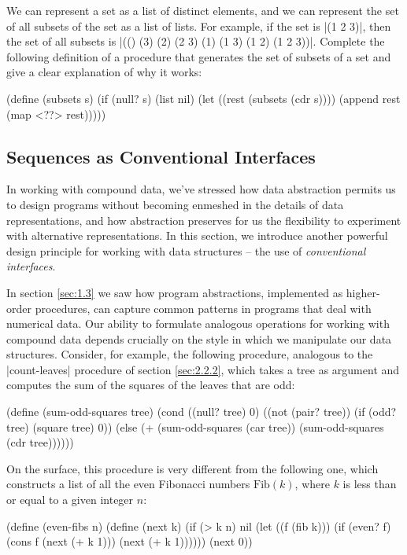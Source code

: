 \begin{Exercise}
\label{exc:2.32}
We can represent a set as a list of distinct elements, and we can
represent the set of all subsets of the set as a list of lists.  For
example, if the set is \scheme|(1 2 3)|, then the set of all subsets
is \scheme|(() (3) (2) (2 3) (1) (1 3) (1 2) (1 2 3))|.  Complete the
following definition of a procedure that generates the set of subsets
of a set and give a clear explanation of why it works:
\begin{schemedisplay}
(define (subsets s)
  (if (null? s)
      (list nil)
      (let ((rest (subsets (cdr s))))
        (append rest (map <??> rest)))))
\end{schemedisplay}
\end{Exercise}

\subsection{Sequences as Conventional Interfaces}
\label{sec:2.2.3}

In working with compound data, we've stressed how data abstraction
permits us to design programs without becoming enmeshed in the details
of data representations, and how abstraction preserves for us the
flexibility to experiment with alternative representations.  In this
section, we introduce another powerful design principle for working
with data structures -- the use of \textit{conventional interfaces}.

In section \ref{sec:1.3} we saw how program abstractions, implemented
as higher-order procedures, can capture common patterns in programs
that deal with numerical data.  Our ability to formulate analogous
operations for working with compound data depends crucially on the
style in which we manipulate our data structures.  Consider, for
example, the following procedure, analogous to the
\scheme|count-leaves| procedure of section \ref{sec:2.2.2}, which
takes a tree as argument and computes the sum of the squares of the
leaves that are odd:
\begin{schemedisplay}
(define (sum-odd-squares tree)
  (cond ((null? tree) 0)  
        ((not (pair? tree))
         (if (odd? tree) (square tree) 0))
        (else (+ (sum-odd-squares (car tree))
                 (sum-odd-squares (cdr tree))))))
\end{schemedisplay}

On the surface, this procedure is very different from the following
one, which constructs a list of all the even Fibonacci numbers
 $\text{Fib}(k)$, where $k$ is less than or equal to a given integer $n$:
\begin{schemedisplay}
(define (even-fibs n)
  (define (next k)
    (if (> k n)
        nil
        (let ((f (fib k)))
          (if (even? f)
              (cons f (next (+ k 1)))
              (next (+ k 1))))))
  (next 0))
\end{schemedisplay}

